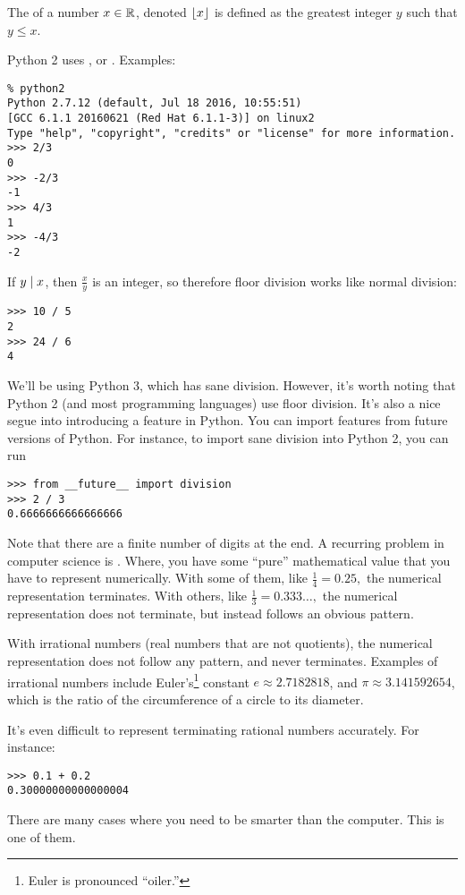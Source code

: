 \begin{definition}
  The  of a number $x \in \mathbb{R}$, denoted $\left\lfloor x \right\rfloor$ is
  defined as the greatest integer $y$ such that $y \le x$.
\end{definition}

Python 2 uses , or . Examples:

\begin{lstlisting}
% python2
Python 2.7.12 (default, Jul 18 2016, 10:55:51) 
[GCC 6.1.1 20160621 (Red Hat 6.1.1-3)] on linux2
Type "help", "copyright", "credits" or "license" for more information.
>>> 2/3
0
>>> -2/3
-1
>>> 4/3
1
>>> -4/3
-2
\end{lstlisting}

If $y \mid x$, then $\frac{x}{y}$ is an integer, so therefore
floor division works like normal division:

\begin{lstlisting}
>>> 10 / 5
2
>>> 24 / 6
4
\end{lstlisting}

We'll be using Python 3, which has sane division. However, it's worth
noting that Python 2 (and most programming languages) use floor
division. It's also a nice segue into introducing a feature in
Python. You can import features from future versions of Python. For
instance, to import sane division into Python 2, you can run

\begin{lstlisting}
>>> from __future__ import division
>>> 2 / 3
0.6666666666666666
\end{lstlisting}

\begin{remark}
  Note that there are a finite number of digits at the end. A
  recurring problem in computer science is . Where, you have some ``pure'' mathematical value
  that you have to represent numerically. With some of them, like
  $\frac{1}{4} = 0.25,$ the numerical representation terminates. With
  others, like $\frac{1}{3} = 0.333\dots,$ the numerical
  representation does not terminate, but instead follows an obvious
  pattern.

  With irrational numbers (real numbers that are not quotients), the
  numerical representation does not follow any pattern, and never
  terminates. Examples of irrational numbers include
  Euler's\footnote{Euler is pronounced ``oiler.''} constant
  $e \approx 2.7182818$, and $\pi \approx 3.141592654$, which is the
  ratio of the circumference of a circle to its diameter. 

  It's even difficult to represent terminating rational numbers
  accurately. For instance:

\begin{lstlisting}
>>> 0.1 + 0.2
0.30000000000000004
\end{lstlisting}

  There are many cases where you need to be smarter than the
  computer. This is one of them.
\end{remark}

